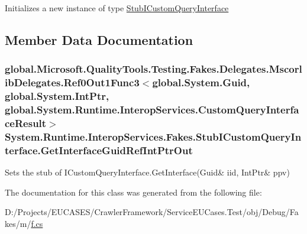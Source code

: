 Initializes a new instance of type \hyperlink{class_system_1_1_runtime_1_1_interop_services_1_1_fakes_1_1_stub_i_custom_query_interface}{Stub\-I\-Custom\-Query\-Interface}



\subsection{Member Data Documentation}
\hypertarget{class_system_1_1_runtime_1_1_interop_services_1_1_fakes_1_1_stub_i_custom_query_interface_a1b2bd11220d0e82d2fc69cc72bf67106}{
\subsubsection[{Get\-Interface\-Guid\-Ref\-Int\-Ptr\-Out}]{\setlength{\rightskip}{0pt plus 5cm}global.\-Microsoft.\-Quality\-Tools.\-Testing.\-Fakes.\-Delegates.\-Mscorlib\-Delegates.\-Ref0\-Out1\-Func3$<$global.\-System.\-Guid, global.\-System.\-Int\-Ptr, global.\-System.\-Runtime.\-Interop\-Services.\-Custom\-Query\-Interface\-Result$>$ System.\-Runtime.\-Interop\-Services.\-Fakes.\-Stub\-I\-Custom\-Query\-Interface.\-Get\-Interface\-Guid\-Ref\-Int\-Ptr\-Out}}\label{class_system_1_1_runtime_1_1_interop_services_1_1_fakes_1_1_stub_i_custom_query_interface_a1b2bd11220d0e82d2fc69cc72bf67106}


Sets the stub of I\-Custom\-Query\-Interface.\-Get\-Interface(Guid\& iid, Int\-Ptr\& ppv)



The documentation for this class was generated from the following file\-:\begin{DoxyCompactItemize}
\item 
D\-:/\-Projects/\-E\-U\-C\-A\-S\-E\-S/\-Crawler\-Framework/\-Service\-E\-U\-Cases.\-Test/obj/\-Debug/\-Fakes/m/\hyperlink{m_2f_8cs}{f.\-cs}\end{DoxyCompactItemize}
